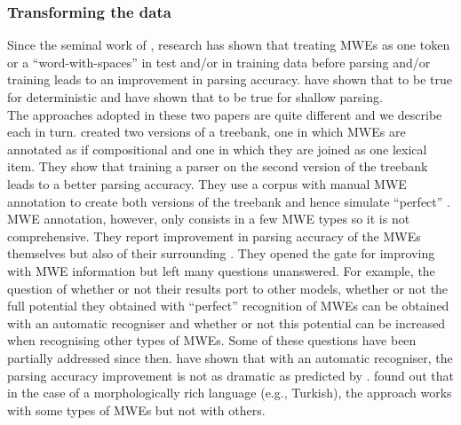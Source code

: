 \documentclass[output=paper]{langsci/langscibook}
\begin{document}
                        \subsubsection{Transforming the data}
                        \label{del:changingdata}
                        \indent Since the seminal work of \citet{nivre2004multiword}, research has shown that treating MWEs as one token or a ``word-with-spaces'' in test and/or in training data before parsing and/or training leads to an improvement in parsing accuracy. \citet{nivre2004multiword} have shown that to be true for deterministic  and \citet{korkontzelosetal2010} have shown that to be true for shallow parsing. \\
                        \indent The approaches adopted in these two papers are quite different and we describe each in turn.
                        \indent \citet{nivre2004multiword} created two versions of a treebank, one in which MWEs are annotated as if compositional and one in which they are joined as one lexical item. They show that training a parser on the second version of the treebank leads to a better parsing accuracy. They use a corpus with manual MWE annotation to create both versions of the treebank and hence simulate ``perfect'' . MWE annotation, however, only consists in a few MWE types so it is not comprehensive. They report improvement in parsing accuracy of the MWEs themselves but also of their surrounding . They opened the gate for improving  with MWE information but left many questions unanswered. For example, the question of whether or not their results port to other  models, whether or not the full potential they obtained with ``perfect'' recognition of MWEs can be obtained with an automatic recogniser and whether or not this potential can be increased when recognising other types of MWEs. Some of these questions have been partially addressed since then. \citet{constant12acl} have shown that with an automatic recogniser, the parsing accuracy improvement is not as dramatic as predicted by \citet{nivre2004multiword}. \citet{eryigit:2011:multiword} found out that in the case of a morphologically rich language (e.g., Turkish), the approach works with some types of MWEs but not with others.
                        \label{del:korkontz}
\end{document}

